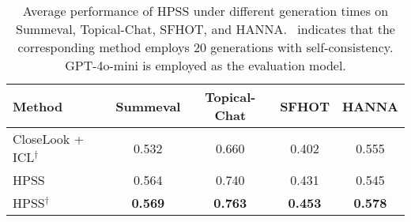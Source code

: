 \begin{table*} [!t]
\small
\centering
\begin{tabular}{l|c|c|c|c}
\toprule
\textbf{Method}  & \textbf{Summeval} & \textbf{Topical-Chat} &\textbf{SFHOT} & \textbf{HANNA}  \\
\midrule
CloseLook + ICL$^{\dag}$ & 0.532  &  0.660  &  0.402 & 0.555        \\
HPSS & 0.564   &  0.740 & 0.431 & 0.545        \\
HPSS$^{\dag}$ & \textbf{0.569}    & \textbf{0.763} &   \textbf{0.453} & \textbf{0.578}        \\
\bottomrule
\end{tabular}
\vspace{-2mm}
\caption{Average performance of HPSS under different generation times on Summeval, Topical-Chat, SFHOT, and HANNA. \dag \  indicates that the corresponding method employs 20 generations with self-consistency. GPT-4o-mini is employed as the evaluation model.}
\label{tab:sc}
\end{table*}